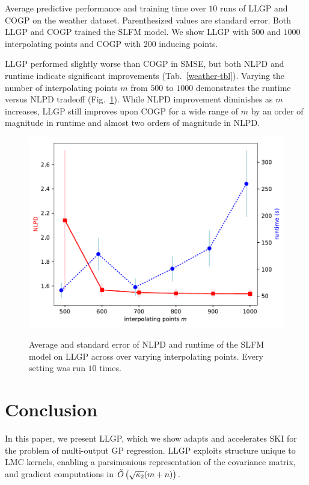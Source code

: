 \documentclass{article}
\begin{document}
\begin{table}[!h]
  \caption{Average predictive performance and training time over $10$ runs of LLGP and COGP on the weather dataset. Parenthesized values are standard error. Both LLGP and COGP trained the SLFM model. We show LLGP with $500$ and $1000$ interpolating points and COGP with $200$ inducing points.}
\label{weather-tbl}
\begin{center}
  \begin{small}
    \begin{sc}
      
\end{sc}
\end{small}
\end{center}
\end{table}

LLGP performed slightly worse than COGP in SMSE, but both NLPD and runtime indicate significant improvements (Tab.~\ref{weather-tbl}). Varying the number of interpolating points $m$ from $500$ to $1000$ demonstrates the runtime versus NLPD tradeoff (Fig.~\ref{fig:llgpweather}). While NLPD improvement diminishes as $m$ increases, LLGP still improves upon COGP for a wide range of $m$ by an order of magnitude in runtime and almost two orders of magnitude in NLPD.

\begin{figure}
\centering
{\includegraphics[width=0.4\columnwidth]{m_time_nlpd.pdf}}
\caption{Average and standard error of NLPD and runtime of the SLFM model on LLGP across over varying interpolating points. Every setting was run $10$ times.}
\label{fig:llgpweather}
\end{figure} 

\section{Conclusion}\label{conclusion}

In this paper, we present LLGP, which we show adapts and accelerates SKI \cite{kiss-gp} for the problem of multi-output GP regression. LLGP exploits structure unique to LMC kernels,  enabling a parsimonious representation of the covariance matrix, and gradient computations in $\tilde{O}\left({\sqrt{\kappa_2}(m+n)}\right)$.
\end{document}

